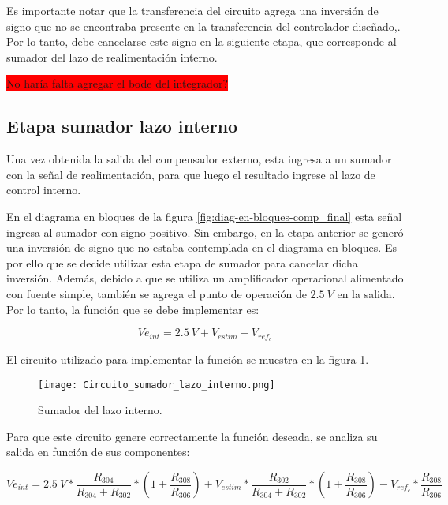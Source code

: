 Es importante notar que la transferencia del circuito agrega una inversión de signo que no se encontraba presente en la transferencia del controlador diseñado,. Por lo tanto, debe cancelarse este signo en la siguiente etapa, que corresponde al sumador del lazo de realimentación interno.


\colorbox{red}{No haría falta agregar el bode del integrador?}

\subsection{Etapa sumador lazo interno}

Una vez obtenida la salida del compensador externo, esta ingresa a un sumador con la señal de realimentación, para que luego el resultado ingrese al lazo de control interno.

En el diagrama en bloques de la figura \ref{fig:diag-en-bloques-comp_final} esta señal ingresa al sumador con signo positivo. Sin embargo, en la etapa anterior se generó una inversión de signo que no estaba contemplada en el diagrama en bloques. Es por ello que se decide utilizar esta etapa de sumador para cancelar dicha inversión. Además, debido a que se utiliza un amplificador operacional alimentado con fuente simple, también se agrega el punto de operación de $2.5\:V$ en la salida. Por lo tanto, la función que se debe implementar es:

\begin{equation}
	Ve_{int}=2.5\:V+V_{estim}-V_{ref_c}
\end{equation}

El circuito utilizado para implementar la función se muestra en la figura \ref{fig:circuito-sumador-lazo-interno}. 

\begin{figure}[H]
	\centering
	\texttt{[image: Circuito\_sumador\_lazo\_interno.png]}
	\caption{Sumador del lazo interno.}
	\label{fig:circuito-sumador-lazo-interno}
\end{figure}

Para que este circuito genere correctamente la función deseada, se analiza su salida en función de sus componentes:

\begin{equation*}
	Ve_{int}=2.5\:V*\frac{R_{304}}{R_{304}+R_{302}}*(1+\frac{R_{308}}{R_{306}})+V_{estim}*\frac{R_{302}}{R_{304}+R_{302}}*(1+\frac{R_{308}}{R_{306}})-V_{ref_c}*\frac{R_{308}}{R_{306}}
\end{equation*}

